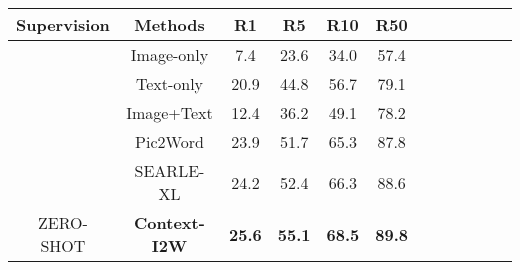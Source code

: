\documentclass[letterpaper]{article} \usepackage{aaai24}  \usepackage{times}  \usepackage{helvet}  \usepackage{courier}  \usepackage[hyphens]{url}  \usepackage{graphicx} \urlstyle{rm} \def\UrlFont{\rm}  \usepackage{natbib}  \usepackage{caption} \frenchspacing  \setlength{\pdfpagewidth}{8.5in} \setlength{\pdfpageheight}{11in} \usepackage{algorithm}
\begin{document}
\begin{table}[t]
\centering
\scalebox{1.05}
{\scriptsize
\begin{tabular}{cccccccccccc}
\toprule
Supervision                                      & Methods                                                   & R1                                               & R5                                               & \multicolumn{1}{l}{R10}                          & R50                                              \\ \midrule
\multicolumn{1}{c|}{}                            & \multicolumn{1}{c|}{Image-only}                           & 7.4                                              & 23.6                                             & 34.0                                             & 57.4                                             \\
\multicolumn{1}{c|}{}                            & \multicolumn{1}{c|}{Text-only}                            & 20.9                                             & 44.8                                             & 56.7                                             & 79.1                                             \\
\multicolumn{1}{c|}{}                            & \multicolumn{1}{c|}{Image+Text}                           & 12.4                                             & 36.2                                             & 49.1                                             & 78.2                                             \\
\multicolumn{1}{c|}{}                            & \multicolumn{1}{c|}{Pic2Word}                             & 23.9                                            & 51.7                                           & 65.3                                            & 87.8                                            \\
\multicolumn{1}{c|}{}                            & \multicolumn{1}{c|}{SEARLE-XL}                   & 24.2                                            & 52.4                                            & 66.3                                            & 88.6                                   \\
\multicolumn{1}{c|}{\multirow{-6}{*}{ZERO-SHOT}}                             & \multicolumn{1}{c|}{\textbf{Context-I2W}}                         & \textbf{25.6}                                   & \textbf{55.1}                                   & \textbf{68.5}                                   & \textbf{89.8}                                   \\

\end{tabular}}
\end{table}
\end{document}
